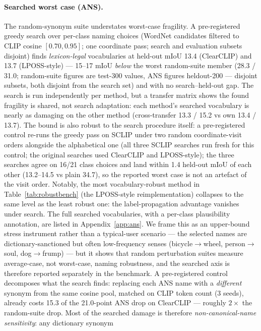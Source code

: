 \documentclass[11pt]{article}
\newcommand{\miou}{mIoU}
\begin{document}
\paragraph{Searched worst case (ANS).} The random-synonym suite understates
worst-case fragility. A pre-registered greedy search over per-class naming
choices (WordNet candidates filtered to CLIP cosine $[0.70,0.95]$; one
coordinate pass; search and evaluation subsets disjoint) finds
\emph{lexicon-legal} vocabularies at held-out \miou{} 13.4 (ClearCLIP) and
13.7 (LPOSS-style) --- 15--17 \miou{} \emph{below} the worst random-suite
member (28.3 / 31.0; random-suite figures are test-300 values, ANS figures
heldout-200 --- disjoint subsets, both disjoint from the search set) and
with no search--held-out gap. The search is run
independently per method, but a transfer matrix shows the found fragility is
shared, not search adaptation: each method's searched vocabulary is nearly as
damaging on the other method (cross-transfer 13.3 / 15.2 vs own 13.4 / 13.7).
The bound is also robust to the search procedure itself: a pre-registered
control re-runs the greedy pass on SCLIP under two random coordinate-visit
orders alongside the alphabetical one (all three SCLIP searches run fresh for
this control; the original searches used ClearCLIP and LPOSS-style); the
three searches agree on 16/21
class choices and land within 1.4 held-out \miou{} of each other
(13.2--14.5 vs plain 34.7), so the reported worst case is not an artefact of
the visit order.
Notably, the most
vocabulary-robust method in Table~\ref{tab:robustbench} (the LPOSS-style
reimplementation) collapses to the same
level as the least robust one: the label-propagation advantage vanishes under
search. The full searched vocabularies, with a per-class plausibility
annotation, are listed in Appendix~\ref{app:ans}. We frame this as an upper-bound stress instrument rather than a
typical-user scenario --- the selected names are dictionary-sanctioned but
often low-frequency senses (bicycle$\to$wheel, person$\to$soul,
dog$\to$frump) --- but it shows that random perturbation suites measure
average-case, not worst-case, naming robustness, and the searched axis is
therefore reported separately in the benchmark. A pre-registered control
decomposes what the search finds: replacing each ANS name with a
\emph{different} synonym from the same cosine pool, matched on CLIP token
count (3 seeds), already costs 15.3 of the 21.0-point ANS drop on ClearCLIP
--- roughly $2\times$ the random-suite drop. Most of the searched damage is
therefore \emph{non-canonical-name sensitivity}: any dictionary synonym
\end{document}

